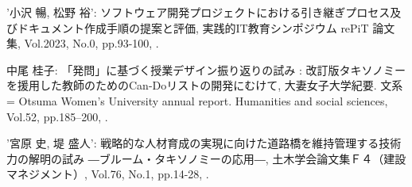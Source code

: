 \documentclass[a4paper,9pt, twocolumn]{jarticle}
\begin{document}
%
%
\begin{thebibliography}{9}
	\itemsep -1.7pt

	{\small '小沢 暢, 松野 裕':
	\newblock ソフトウェア開発プロジェクトにおける引き継ぎプロセス及びドキュメント作成手順の提案と評価,
	\newblock 実践的IT教育シンポジウム rePiT 論文集,
	\newblock Vol.2023,
	\newblock No.0,
	\newblock pp.93-100,
	.}

	{\small 中尾 桂子:
		\newblock「発問」に基づく授業デザイン振り返りの試み : 改訂版タキソノミーを援用した教師のためのCan-Doリストの開発にむけて,
		\newblock 大妻女子大学紀要. 文系 = Otsuma Women's University annual report. Humanities and social sciences,
		\newblock Vol.52,
		\newblock pp.185–200,
		.}

	{\small '宮原 史, 堤 盛人':
		\newblock 戦略的な人材育成の実現に向けた道路橋を維持管理する技術力の解明の試み ―ブルーム・タキソノミーの応用―,
		\newblock 土木学会論文集Ｆ４（建設マネジメント）,
		\newblock Vol.76,
		\newblock No.1,
		\newblock pp.14-28,
		.}

\end{thebibliography}
\end{document}
